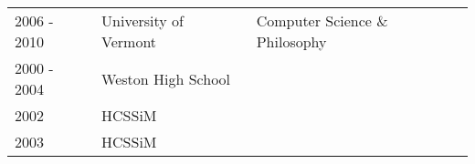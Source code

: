 \documentclass[12t]{article}
\begin{document}
\vspace{3pt}\begin{tabular}{lll}
  2006 - 2010 & University of Vermont & Computer Science \& Philosophy\\
  2000 - 2004 & Weston High School &  \\
  2002 &  HCSSiM & \\
  2003 &  HCSSiM & \\ 
\end{tabular}


\end{document}

